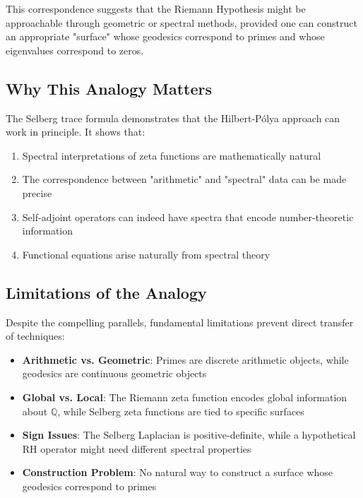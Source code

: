 \begin{remark}
This correspondence suggests that the Riemann Hypothesis might be approachable through geometric or spectral methods, provided one can construct an appropriate "surface" whose geodesics correspond to primes and whose eigenvalues correspond to zeros.
\end{remark}

\subsection{Why This Analogy Matters}

The Selberg trace formula demonstrates that the Hilbert-Pólya approach can work in principle. It shows that:

\begin{enumerate}
\item Spectral interpretations of zeta functions are mathematically natural
\item The correspondence between "arithmetic" and "spectral" data can be made precise
\item Self-adjoint operators can indeed have spectra that encode number-theoretic information
\item Functional equations arise naturally from spectral theory
\end{enumerate}

\subsection{Limitations of the Analogy}

Despite the compelling parallels, fundamental limitations prevent direct transfer of techniques:

\begin{itemize}
\item \textbf{Arithmetic vs. Geometric}: Primes are discrete arithmetic objects, while geodesics are continuous geometric objects
\item \textbf{Global vs. Local}: The Riemann zeta function encodes global information about $\mathbb{Q}$, while Selberg zeta functions are tied to specific surfaces
\item \textbf{Sign Issues}: The Selberg Laplacian is positive-definite, while a hypothetical RH operator might need different spectral properties
\item \textbf{Construction Problem}: No natural way to construct a surface whose geodesics correspond to primes
\end{itemize}

